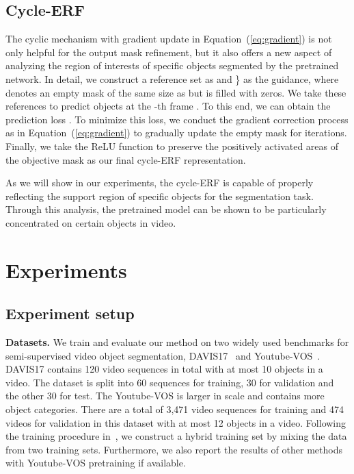 \documentclass{article}
\begin{document}
\subsection{Cycle-ERF}
The cyclic mechanism with gradient update in Equation~(\ref{eq:gradient}) is not only helpful for the output mask refinement, but it also offers a new aspect of analyzing the region of interests of specific objects segmented by the pretrained network. In detail, we construct a reference set as  and \} as the guidance, where  denotes an empty mask of the same size as  but is filled with zeros. We take these references to predict objects at the -th frame . To this end, we can obtain the prediction loss . To minimize this loss, we conduct the gradient correction process as in Equation~(\ref{eq:gradient}) to gradually update the empty mask for  iterations. Finally, we take the ReLU function to preserve the positively activated areas of the objective mask as our final cycle-ERF representation.


As we will show in our experiments, the cycle-ERF is capable of properly reflecting the support region of specific objects for the segmentation task. Through this analysis, the pretrained model can be shown to be particularly concentrated on certain objects in video. 


\section{Experiments}

\subsection{Experiment setup}
\textbf{Datasets.} We train and evaluate our method on two widely used benchmarks for semi-supervised video object segmentation, DAVIS17~\cite{Pont-Tuset_arXiv_2017} and Youtube-VOS~\cite{Xu_2018_S2S_ECCV}. DAVIS17 contains 120 video sequences in total with at most 10 objects in a video. The dataset is split into 60 sequences for training, 30 for validation and the other 30 for test. The Youtube-VOS is larger in scale and contains more object categories. There are a total of 3,471 video sequences for training and 474 videos for validation in this dataset with at most 12 objects in a video. Following the training procedure in~\cite{Oh_2019_ICCV,Voigtlaender_2019_CVPR}, we construct a hybrid training set by mixing the data from two training sets. Furthermore, we also report the results of other methods with Youtube-VOS pretraining if available.
\end{document}
